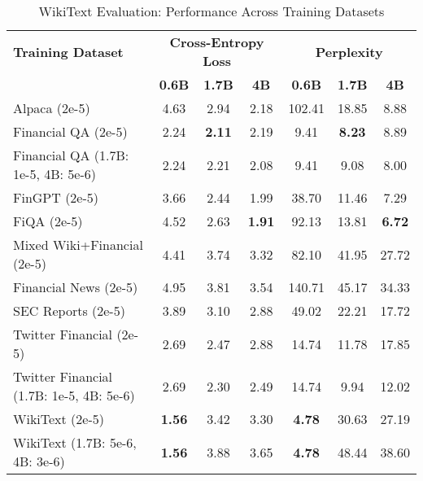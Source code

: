 
\begin{table}[h]
\centering
\caption[WikiText Evaluation: Cross-Dataset Performance]{WikiText Evaluation: Performance Across Training Datasets}
\label{tab:cross_wikitext}
\begin{tabular}{l|ccc|ccc}
\hline
\textbf{Training Dataset} & \multicolumn{3}{c|}{\textbf{Cross-Entropy Loss}} & \multicolumn{3}{c}{\textbf{Perplexity}} \\
\cline{2-4} \cline{5-7}
  & \textbf{0.6B} & \textbf{1.7B} & \textbf{4B} & \textbf{0.6B} & \textbf{1.7B} & \textbf{4B} \\
Alpaca (2e-5) & 4.63 & 2.94 & 2.18 & 102.41 & 18.85 & 8.88  \\
Financial QA (2e-5) & 2.24 & \textbf{2.11} & 2.19 & 9.41 & \textbf{8.23} & 8.89  \\
Financial QA (1.7B: 1e-5, 4B: 5e-6) & 2.24 & 2.21 & 2.08 & 9.41 & 9.08 & 8.00  \\
FinGPT (2e-5) & 3.66 & 2.44 & 1.99 & 38.70 & 11.46 & 7.29  \\
FiQA (2e-5) & 4.52 & 2.63 & \textbf{1.91} & 92.13 & 13.81 & \textbf{6.72}  \\
Mixed Wiki+Financial (2e-5) & 4.41 & 3.74 & 3.32 & 82.10 & 41.95 & 27.72  \\
Financial News (2e-5) & 4.95 & 3.81 & 3.54 & 140.71 & 45.17 & 34.33  \\
SEC Reports (2e-5) & 3.89 & 3.10 & 2.88 & 49.02 & 22.21 & 17.72  \\
Twitter Financial (2e-5) & 2.69 & 2.47 & 2.88 & 14.74 & 11.78 & 17.85  \\
Twitter Financial (1.7B: 1e-5, 4B: 5e-6) & 2.69 & 2.30 & 2.49 & 14.74 & 9.94 & 12.02  \\
WikiText (2e-5) & \textbf{1.56} & 3.42 & 3.30 & \textbf{4.78} & 30.63 & 27.19  \\
WikiText (1.7B: 5e-6, 4B: 3e-6) & \textbf{1.56} & 3.88 & 3.65 & \textbf{4.78} & 48.44 & 38.60  \\
\hline
\end{tabular}
\end{table}

